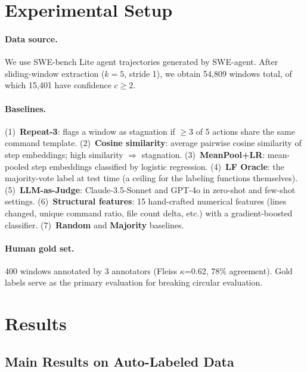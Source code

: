\documentclass[11pt]{article}
\begin{document}
\section{Experimental Setup}
\label{sec:setup}

\paragraph{Data source.}
We use SWE-bench Lite agent trajectories generated by SWE-agent. After sliding-window extraction ($k{=}5$, stride 1), we obtain 54,809 windows total, of which 15,401 have confidence $c \geq 2$.

\paragraph{Baselines.}
(1)~\textbf{Repeat-3}: flags a window as stagnation if $\geq$3 of 5 actions share the same command template.
(2)~\textbf{Cosine similarity}: average pairwise cosine similarity of step embeddings; high similarity $\Rightarrow$ stagnation.
(3)~\textbf{MeanPool+LR}: mean-pooled step embeddings classified by logistic regression.
(4)~\textbf{LF Oracle}: the majority-vote label at test time (a ceiling for the labeling functions themselves).
(5)~\textbf{LLM-as-Judge}: Claude-3.5-Sonnet and GPT-4o in zero-shot and few-shot settings.
(6)~\textbf{Structural features}: 15 hand-crafted numerical features (lines changed, unique command ratio, file count delta, etc.) with a gradient-boosted classifier.
(7)~\textbf{Random} and \textbf{Majority} baselines.

\paragraph{Human gold set.}
400 windows annotated by 3 annotators (Fleiss $\kappa$=0.62, 78\% agreement). Gold labels serve as the primary evaluation for breaking circular evaluation.

\section{Results}
\label{sec:results}

\subsection{Main Results on Auto-Labeled Data}
\end{document}
